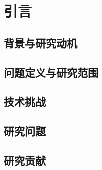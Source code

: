 \chapter{引言}
\label{ch:introduction}

\section{背景与研究动机}
\label{sec:1-1}


\section{问题定义与研究范围}
\label{sec:1-2}


\section{技术挑战}
\label{sec:1-3}


\section{研究问题}
\label{sec:1-4}


\section{研究贡献}
\label{sec:1-5}

